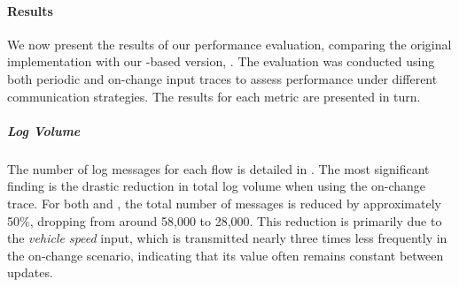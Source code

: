 \paragraph{Results}

We now present the results of our performance evaluation, comparing the original \dispute
implementation with our \GRust-based version, \disgrust. The evaluation was conducted using both
periodic and on-change input traces to assess performance under different communication
strategies. The results for each metric are presented in turn.

\subparagraph{Log Volume}

The number of log messages for each flow is detailed in
. The most significant finding is the drastic
reduction in total log volume when using the on-change trace. For both \dispute and \disgrust, the
total number of messages is reduced by approximately 50\%, dropping from around 58,000 to 28,000.
This reduction is primarily due to the \emph{vehicle speed} input, which is transmitted nearly three
times less frequently in the on-change scenario, indicating that its value often remains constant
between updates.

